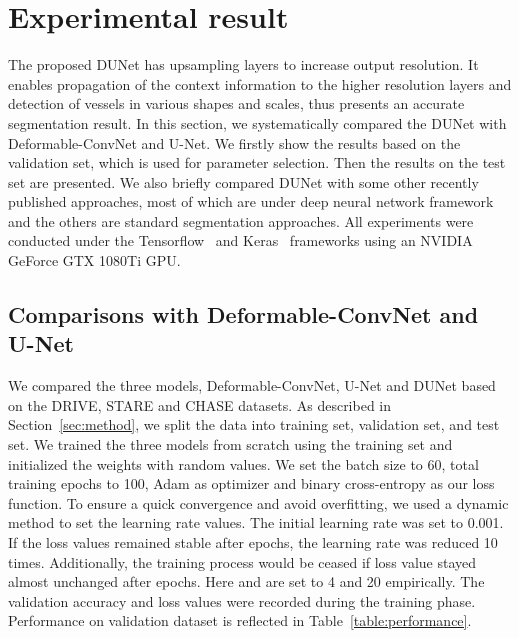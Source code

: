 \documentclass[journal]{IEEEtran}
\begin{document}
\section{Experimental result}
\label{sec:experimental}
The proposed DUNet has upsampling layers to increase output resolution. It enables propagation of the context information to the higher resolution layers and detection of vessels in various shapes and scales, thus presents an accurate segmentation result. In this section, we systematically compared the DUNet with Deformable-ConvNet and U-Net. We firstly show the results based on the validation set, which is used for parameter selection. Then the results on the test set are presented. We also briefly compared DUNet with some other recently published approaches, most of which are under deep neural network framework and the others are standard segmentation approaches. All experiments were conducted under the Tensorflow~\cite{abadi_tensorflow:_2016} and Keras~\cite{chollet_keras_2015} frameworks using an NVIDIA GeForce GTX 1080Ti GPU.

\subsection{Comparisons with Deformable-ConvNet and U-Net}
We compared the three models, Deformable-ConvNet, U-Net and DUNet based on the DRIVE, STARE and CHASE datasets. As described in Section~\ref{sec:method}, we split the data into training set, validation set, and test set. We trained the three models from scratch using the training set and initialized the weights with random values. We set the batch size to 60, total training epochs to 100, Adam as optimizer and binary cross-entropy as our loss function. To ensure a quick convergence and avoid overfitting, we used a dynamic method to set the learning rate values. The initial learning rate was set to 0.001. If the loss values remained stable after  epochs, the learning rate was reduced 10 times. Additionally, the training process would be ceased if loss value stayed almost unchanged after  epochs. Here  and  are set to 4 and 20 empirically. The validation accuracy and loss values were recorded during the training phase. Performance on validation dataset is reflected in Table~\ref{table:performance}.
\end{document}

